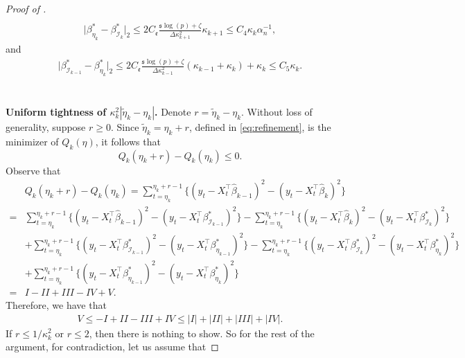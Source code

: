 \documentclass[11pt]{article}
\newcommand{\s}{ { \mathfrak{s}  } }
\theoremstyle{plain}
\theoremstyle{definition}
\begin{document}
\begin{proof}[Proof of ]
\begin{align}
\end{align}
\begin{align}\label{eq:bias_2}
    \big| \beta_{\eta_{k}}^* - \beta_{\mathcal{I}_{k}}^* \big|_2 \leq  2C_{\mathfrak{e}}\frac{\s \log(p) + \zeta}{\Delta\kappa_{k+1}^2}\kappa_{k+1} \leq C_4\kappa_{k}\alpha_n^{-1},
\end{align}
and
\begin{align}\label{eq:bias_3}
    \big| \beta^*_{\mathcal{I}_{k-1}} - \beta^*_{\eta_{k}} \big|_2 \leq  2C_{\mathfrak{e}}\frac{\s \log(p) + \zeta}{\Delta\kappa_{k-1}^2}(\kappa_{k-1} + \kappa_{k}) + \kappa_{k} \leq C_5\kappa_{k}.
\end{align}
\\
\\
\textbf{Uniform tightness of $\kappa_k^2|\widetilde{\eta}_k - \eta_k|$.}
Denote $r = \widetilde{\eta}_k - \eta_k$. Without loss of generality, suppose $r \geq 0$. Since $\widetilde{\eta}_k = \eta_k + r$, defined in \eqref{eq:refinement}, is the minimizer of $Q_k(\eta)$, it follows that
$$Q_k(\eta_k+ r) - Q_k(\eta_k) \leq 0.$$
Observe that
\begin{align*}
    &Q_k(\eta_k+ r) - Q_k(\eta_k) = \sum_{t = \eta_k}^{\eta_k + r - 1} \big\{(y_t - X_t^{\top}\widehat{\beta}_{k-1})^2 - (y_t - X_t^{\top}\widehat{\beta}_{k})^2\big\}\\ 
    =&\sum_{t = \eta_k}^{\eta_k + r - 1} \big\{(y_t - X_t^{\top}\widehat{\beta}_{k-1})^2 - (y_t - X_t^{\top}\beta^*_{\mathcal{I}_{k-1}})^2\big\} - \sum_{t = \eta_k}^{\eta_k + r - 1} \big\{(y_t - X_t^{\top}\widehat{\beta}_{k})^2 - (y_t - X_t^{\top}\beta^*_{\mathcal{I}_{k}})^2\big\}\\
    &+ \sum_{t = \eta_k}^{\eta_k + r - 1} \big\{(y_t - X_t^{\top}\beta^*_{\mathcal{I}_{k-1}})^2 - (y_t - X_t^{\top}\beta^*_{\eta_{k-1}})^2\big\} - \sum_{t = \eta_k}^{\eta_k + r - 1} \big\{(y_t - X_t^{\top}\beta^*_{\mathcal{I}_{k}})^2 - (y_t - X_t^{\top}\beta^*_{\eta_{k}})^2\big\}\\
    &+ \sum_{t = \eta_k}^{\eta_k + r - 1} \big\{(y_t - X_t^{\top}\beta^*_{\eta_{k-1}})^2 - (y_t - X_t^{\top}\beta^*_{\eta_{k}})^2\big\}\\
    =& I - II + III - IV + V.
\end{align*}
Therefore, we have that
\begin{align}\label{eq:refine_signal_noise}
    V \leq -I + II - III + IV \leq |I| + |II| + |III| + |IV|.
\end{align}
If $r \leq 1/\kappa_k^2$ or $r \leq 2$, then there is nothing to show. So for the rest of the argument, for contradiction, let us assume that

\end{proof}
\end{document}
